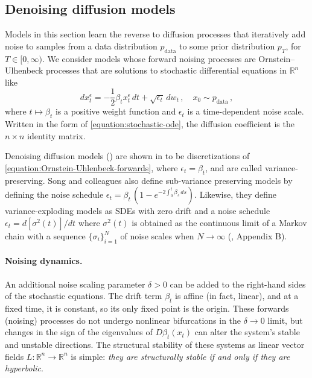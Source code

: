 \documentclass[12pt]{article}
\begin{document}

\subsection{Denoising diffusion models}
\label{subsection:applications-diffusion-models-modern-hopfield}
Models in this section learn the reverse to diffusion processes that iteratively add noise to samples from a data distribution $p_{\text{data}}$ to some prior distribution $p_T$, for $T \in [0,\infty)$. We consider models whose forward noising processes are Ornstein–Ulhenbeck processes that are solutions to stochastic differential equations in $\mathbb{R}^n$ like
\begin{equation}
\label{equation:Ornstein-Uhlenbeck-forwards}
    d{x^{\epsilon}_t} = -\frac{1}{2}\beta_t x^{\epsilon}_t \,dt + \sqrt{\epsilon_t}\,dw_t \,  ,\hspace{1em} x_0 \sim p_{\text{data}} \, ,
\end{equation}
where $t \mapsto \beta_t$ is a positive weight function and $\epsilon_t$ is a time-dependent noise scale. Written in the form of \eqref{equation:stochastic-ode}, the diffusion coefficient is the $n \times n$ identity matrix. 

Denoising diffusion models (\cite{ho2020denoising,sohl2015deep}) are shown in \cite{song2020score} to be discretizations of \eqref{equation:Ornstein-Uhlenbeck-forwards}, where $\epsilon_t = \beta_t$, and are called variance-preserving. Song and colleagues also define sub-variance preserving models by defining the noise schedule
$\epsilon_t = \beta_t \, \left(1-e^{-2 \int_0^t \beta_s \, ds} \right)$. Likewise, they define variance-exploding models as SDEs with zero drift and a noise schedule $\epsilon_t = d[\sigma^2(t)]/dt$ where $\sigma^2(t)$ is obtained as the continuous limit of a Markov chain with a sequence $\{ \sigma_i \}_{i=1}^N$ of noise scales when $N \rightarrow \infty$ (\cite{song2020score}, Appendix B).

\paragraph{Noising dynamics.} An additional noise scaling parameter $\delta>0$ can be added to the right-hand sides of the stochastic equations. The drift term $\beta_t$ is affine (in fact, linear), and at a fixed time, it is constant, so its only fixed point is the origin. These forwards (noising) processes do not undergo nonlinear bifurcations in the $\delta \rightarrow 0$ limit, but changes in the sign of the eigenvalues of $D\beta_t(x_t)$ can alter the system's stable and unstable directions. The structural stability of these systems as linear vector fields $L: \mathbb{R}^n \rightarrow \mathbb{R}^n$ is simple: \textit{they are structurally stable if and only if they are hyperbolic}.
\end{document}

